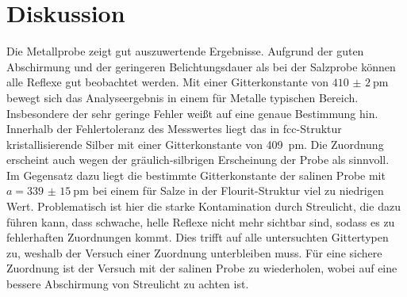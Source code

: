 \section{Diskussion}
Die Metallprobe zeigt gut auszuwertende Ergebnisse. Aufgrund der guten Abschirmung
und der geringeren Belichtungsdauer als bei der Salzprobe können alle Reflexe gut
beobachtet werden. Mit einer Gitterkonstante von $\SI{410(2)}{\pico\metre}$
bewegt sich das Analyseergebnis in einem für Metalle typischen Bereich.
Insbesondere der sehr geringe Fehler weißt auf eine genaue Bestimmung hin.
Innerhalb der Fehlertoleranz des Messwertes liegt das in fcc-Struktur kristallisierende
Silber mit einer Gitterkonstante von \SI{409}{\pico\metre}\cite{AM}. Die Zuordnung erscheint
auch wegen der gräulich-silbrigen Erscheinung der Probe als sinnvoll.\\
Im Gegensatz dazu liegt die bestimmte Gitterkonstante der salinen Probe mit
$a=\SI{339(15)}{\pico\metre}$ bei einem für Salze in der Flourit-Struktur
viel zu niedrigen Wert. Problematisch ist hier
die starke Kontamination durch Streulicht, die dazu führen kann, dass schwache,
helle Reflexe nicht mehr sichtbar sind, sodass es zu fehlerhaften Zuordnungen kommt.
Dies trifft auf alle untersuchten Gittertypen zu, weshalb der Versuch einer
Zuordnung unterbleiben muss.
Für eine sichere Zuordnung ist der Versuch mit der salinen Probe zu wiederholen,
wobei auf eine bessere Abschirmung von Streulicht zu achten ist.
